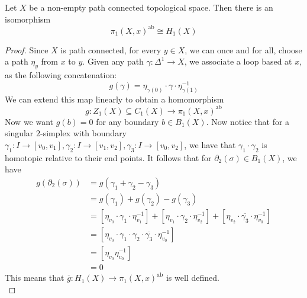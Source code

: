 \documentclass[a4paper]{article}
\begin{document}
\begin{thm}{}{} Let $X$ be a non-empty path connected topological space. Then there is an isomorphism $$\pi_1(X,x)^\text{ab}\cong H_1(X)$$ 
\begin{proof}
Since $X$ is path connected, for every $y\in X$, we can once and for all, choose a path $\eta_y$ from $x$ to $y$. Given any path $\gamma:\Delta^1\to X$, we associate a loop based at $x$, as the following concatenation: $$g(\gamma)=\eta_{\gamma(0)}\cdot\gamma\cdot\eta_{\gamma(1)}^{-1}$$ We can extend this map linearly to obtain a homomorphism $$g:Z_1(X)\subseteq C_1(X)\to\pi_1(X,x)^\text{ab}$$ Now we want $g(b)=0$ for any boundary $b\in B_1(X)$. Now notice that for a singular $2$-simplex with boundary $\gamma_1:I\to[v_0,v_1],\gamma_2:I\to[v_1,v_2],\gamma_3:I\to[v_0,v_2]$, we have that $\gamma_1\cdot\gamma_2$ is homotopic relative to their end points. It follows that for $\partial_2(\sigma)\in B_1(X)$, we have 
\begin{align*}
g(\partial_2(\sigma))&=g(\gamma_1+\gamma_2-\gamma_3)\\
&=g(\gamma_1)+g(\gamma_2)-g(\gamma_3)\\
&=[\eta_{v_0}\cdot\gamma_1\cdot\eta_{v_1}^{-1}]+[\eta_{v_1}\cdot\gamma_2\cdot\eta_{v_2}^{-1}]+[\eta_{v_2}\cdot\overline{\gamma_3}\cdot\eta_{v_0}^{-1}]\\
&=[\eta_{v_0}\cdot\gamma_1\cdot\gamma_2\cdot\overline{\gamma_3}\cdot\eta_{v_0}^{-1}]\\
&=[\eta_{v_0}\eta_{v_0}^{-1}]\\
&=0
\end{align*}
This means that $\overline{g}:H_1(X)\to\pi_1(X,x)^\text{ab}$ is well defined. \\


\end{proof}
\end{thm}
\end{document}
